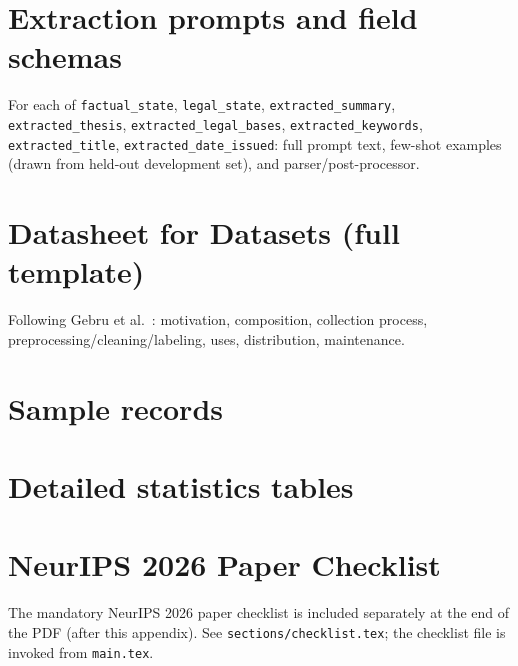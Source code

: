 
\section{Extraction prompts and field schemas}
\label{sec:appendix:prompts}

For each of \texttt{factual\_state}, \texttt{legal\_state}, \texttt{extracted\_summary}, \texttt{extracted\_thesis}, \texttt{extracted\_legal\_bases}, \texttt{extracted\_keywords}, \texttt{extracted\_title}, \texttt{extracted\_date\_issued}: full prompt text, few-shot examples (drawn from held-out development set), and parser/post-processor.


\section{Datasheet for Datasets (full template)}
\label{sec:appendix:datasheet}

Following Gebru et al.~\citep{gebru2021datasheets}: motivation, composition, collection process, preprocessing/cleaning/labeling, uses, distribution, maintenance.


\section{Sample records}
\label{sec:appendix:samples}


\section{Detailed statistics tables}
\label{sec:appendix:stats}


\section{NeurIPS 2026 Paper Checklist}
\label{sec:appendix:checklist}

The mandatory NeurIPS 2026 paper checklist is included separately at the end of the PDF (after this appendix). See \texttt{sections/checklist.tex}; the checklist file is invoked from \texttt{main.tex}.
